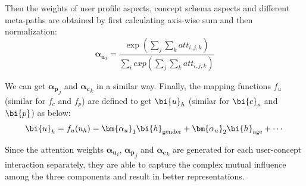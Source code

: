 Then the weights of user profile aspects, concept schema aspects and different meta-paths are obtained by first calculating axis-wise sum and then normalization:
\begin{equation}
{\bm{\alpha_u}}_i = \frac{\exp(\sum_{j}\sum_{k} att_{i,j,k})}{\sum_{i}exp(\sum_{j}\sum_{k} att_{i,j,k})}
\end{equation}

We can get ${\bm{\alpha_p}}_j$ and ${\bm{\alpha_c}}_k$ in a similar way.
Finally, the mapping functions $f_u$ (similar for $f_c$ and $f_p$) are defined to get $\bi{u}_h$ (similar for $\bi{c}_s$ and $\bi{p}$) as below:
\begin{equation}
\bi{u}_h = f_u(u_h) = {\bm{\alpha_u}}_1 \bi{h}_{\text{gender}} + {\bm{\alpha_u}}_2 \bi{h}_{\text{age}} + \cdots 
\end{equation}

Since the attention weights ${\bm{\alpha_u}}_i$, ${\bm{\alpha_p}}_j$ and ${\bm{\alpha_c}}_k$ are generated for each user-concept interaction separately, they are able to capture the complex mutual influence among the three components and result in better representations.

 
 
 


